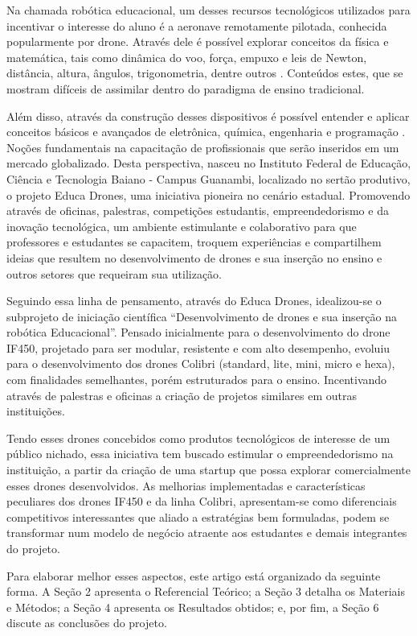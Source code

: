 \documentclass[conference]{IEEEtran}
\begin{document}
Na chamada robótica educacional, um desses recursos tecnológicos  utilizados para incentivar o interesse do aluno é a aeronave remotamente pilotada, conhecida popularmente por drone. Através dele é possível explorar conceitos da física e matemática, tais como dinâmica do voo, força, empuxo e leis de Newton, distância, altura, ângulos, trigonometria, dentre outros \cite{b11}. Conteúdos estes, que se mostram difíceis de assimilar dentro do paradigma de ensino tradicional.

Além disso, através da construção desses dispositivos é possível entender e aplicar conceitos básicos e avançados de eletrônica, química, engenharia e programação \cite{b12}. Noções fundamentais na capacitação de profissionais que serão inseridos em um mercado globalizado. Desta perspectiva, nasceu no Instituto Federal de Educação, Ciência e Tecnologia Baiano - Campus Guanambi, localizado no sertão produtivo, o projeto Educa Drones, uma iniciativa pioneira no cenário estadual. Promovendo através de oficinas, palestras, competições estudantis, empreendedorismo e da inovação tecnológica, um ambiente estimulante e colaborativo para que professores e estudantes se capacitem, troquem experiências e comparti\-lhem ideias que resultem no desenvolvimento de drones e sua inserção no ensino e outros setores que requeiram sua utilização.

Seguindo essa linha de pensamento, através do Educa Drones, idealizou-se o subprojeto de iniciação científica “Desenvolvimento de drones e sua inserção na robótica Educacional”. Pensado inicialmente para o desenvolvimento do drone IF450, projetado para ser modular, resistente  e com alto desempenho, evoluiu para o desenvolvimento dos drones Colibri (standard, lite, mini, micro e hexa), com finalidades semelhantes, porém estruturados para o ensino. Incentivando através de palestras e oficinas a criação de projetos similares em outras instituições.

Tendo esses drones concebidos como produtos tecnológicos de interesse de um público nichado, essa iniciativa tem buscado estimular o empreendedorismo na instituição, a partir da criação de uma startup que possa explorar comercialmente esses drones desenvolvidos. As melhorias implementadas e características peculiares dos drones IF450 e da linha Colibri, apresentam-se como diferenciais competitivos interessantes que aliado a estratégias bem formuladas, podem se transformar num modelo de negócio atraente aos estudantes e demais integrantes do projeto. 

Para elaborar melhor esses aspectos, este artigo está organizado da seguinte forma. A Seção 2 apresenta o Referencial Teórico; a Seção 3 detalha os Materiais e Métodos; a Seção 4 apresenta os Resultados obtidos; e, por fim, a Seção 6 discute as conclusões do projeto.
\end{document}
